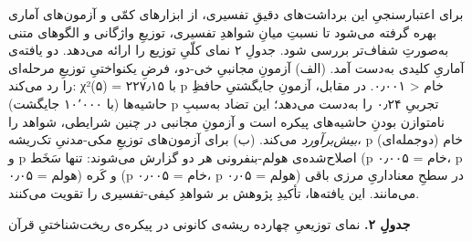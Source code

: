 \begin{RTL}
\begin{otherlanguage}{persian}
برای اعتبارسنجیِ این برداشت‌های دقیقِ تفسیری، از ابزارهای کمّی و آزمون‌های
آماری بهره گرفته می‌شود تا نسبتِ میانِ شواهدِ تفسیری، توزیعِ واژگانی و
الگوهای متنی به‌صورتِ شفاف‌تر بررسی شود. جدولِ ۲ نمای کلّیِ توزیع را ارائه
می‌دهد. دو یافته‌ی آماریِ کلیدی به‌دست آمد. (الف) آزمونِ مجانبیِ خی-دو، فرضِ
یکنواختیِ توزیعِ مرحله‌ای را رد می‌کند: χ²(۵) = ۲۲۷٫۱۵ با p خام \textless{}
۰٫۰۰۱. در مقابل، آزمونِ جایگشتیِ حافظِ حاشیه‌ها (با ۱۰٬۰۰۰ جایگشت) p تجربیِ
۰٫۲۴ را به‌دست می‌دهد؛ این تضاد به‌سببِ نامتوازن بودنِ حاشیه‌های پیکره است و
آزمونِ مجانبی در چنین شرایطی، شواهد را \emph{بیش‌برآورد} می‌کند. (ب) برای
آزمون‌های توزیعِ مکی-مدنیِ تک‌ریشه، p خام (دوجمله‌ای) و p اصلاح‌شده‌ی
هولم-بنفرونی هر دو گزارش می‌شوند: تنها سَخَط (p خام = ۰٫۰۰۵، p هولم = ۰٫۰۵)
و کَره (p خام = ۰٫۰۰۵، p هولم = ۰٫۰۵) در سطحِ معناداریِ مرزی باقی می‌مانند.
این یافته‌ها، تأکیدِ پژوهش بر شواهدِ کیفی-تفسیری را تقویت می‌کنند.

\textbf{جدولِ ۲.} نمای توزیعیِ چهارده ریشه‌ی کانونی در پیکره‌ی ریخت‌شناختیِ
قرآن


\end{otherlanguage}
\end{RTL}
